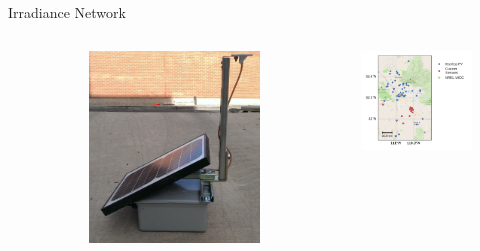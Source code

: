 \documentclass[aspectratio=169]{beamer}
\begin{document}
\begin{frame}{Irradiance Network}
\begin{columns}
\begin{column}{0.3\textwidth}
\begin{figure}[h]
\end{figure}
\end{column}
\begin{column}{0.2\textwidth}
\begin{figure}[h]
\includegraphics[height=.5\textheight]{../dissertation/figs/sensor_outside.jpg}
\end{figure}
\end{column}
\begin{column}{0.4\textwidth}
\begin{figure}[h]
\centering
\includegraphics[height=0.7\textheight]{../dissertation/figs/map.pdf}

\end{figure}
\end{column}
\end{columns}
\end{frame}
\end{document}

